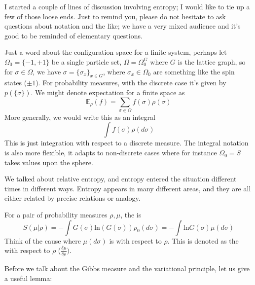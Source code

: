 

I started a couple of lines of discussion involving entropy; I would like to tie up a few of those loose ends. Just to remind you, please do not hesitate to ask questions about notation and the like; we have a very mixed audience and it's good to be reminded of elementary questions. 

\begin{rem}
Just a word about the configuration space for a finite system, perhaps let $\Omega_0 = \{-1, +1\}$ be a single particle set,  $\Omega = \Omega_0^G$ where $G$ is the lattice graph, so for $\sigma \in \Omega$, we have $\sigma = \{\sigma_x\}_{x \in G}$, where $\sigma_x \in \Omega_0$ are something like the spin states ($\pm 1$). For probability measures, with the discrete case it's given by $p(\{\sigma\})$. We might denote expectation for a finite space as 
\[
\mathbb{E}_{\rho}(f) = \sum_{\sigma \in \Omega} f(\sigma) \rho(\sigma)
\]
More generally, we would write this as an integral
\[
\int f(\sigma) \rho(d\sigma)
\]
This is just integration with respect to a discrete measure. The integral notation is also more flexible, it adapts to non-discrete cases where for instance $\Omega_0 = S$ takes values upon the sphere. 
\end{rem}


We talked about relative entropy, and entropy entered the situation different times in different ways. Entropy appears in many different areas, and they are all either related by precise relations or analogy. 

\begin{df} For a pair of probability measures $\rho, \mu$, the  is 
\[
S(\mu | \rho) = -\int G(\sigma) \text{ln}(G(\sigma))\rho_0(d\sigma) = - \int \text{ln} G(\sigma) \mu(d\sigma)
\]
Think of the cause where $\mu(d\sigma)$ is  with respect to $\rho$. This is denoted as the  with respect to $\rho$ ($\frac{\delta\mu}{\delta\rho})$. 
\end{df}

Before we talk about the Gibbs measure and the variational principle, let us give a useful lemma: 


